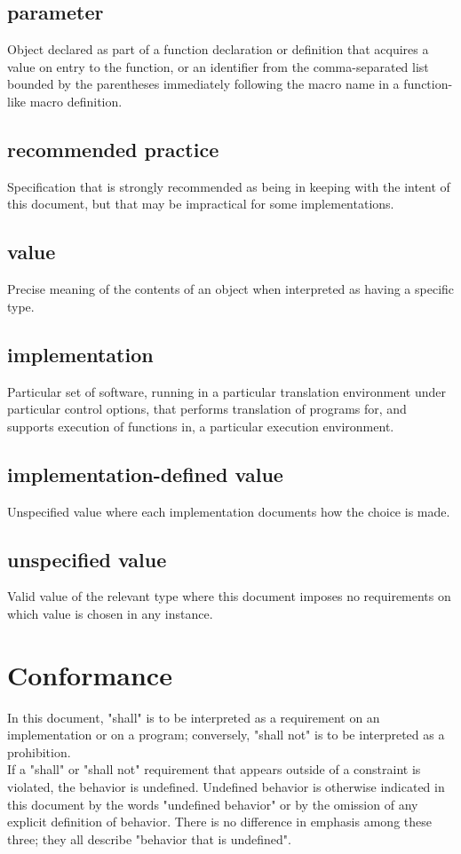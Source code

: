 \documentclass{article}
\begin{document}
\subsection*{parameter}
Object declared as part of a function declaration or definition that acquires a value on
entry to the function, or an identifier from the comma-separated list bounded by the
parentheses immediately following the macro name in a function-like macro definition.

\subsection*{recommended practice}
Specification that is strongly recommended as being in keeping with the intent of this
document, but that may be impractical for some implementations.

\subsection*{value}
Precise meaning of the contents of an object when interpreted as having a specific type.

\subsection*{implementation}
Particular set of software, running in a particular translation environment under
particular control options, that performs translation of programs for, and supports
execution of functions in, a particular execution environment.

\subsection*{implementation-defined value}
Unspecified value where each implementation documents how the choice is made.

\subsection*{unspecified value}
Valid value of the relevant type where this document imposes no requirements on which
value is chosen in any instance.

\section{Conformance}
In this document, "shall" is to be interpreted as a requirement on an implementation
or on a program; conversely, "shall not" is to be interpreted as a prohibition. \\
If a "shall" or "shall not" requirement that appears outside of a constraint is violated,
the behavior is undefined.  Undefined behavior is otherwise indicated in this document by
the words "undefined behavior" or by the omission of any explicit definition of behavior.
There is no difference in emphasis among these three; they all describe "behavior that is
undefined".
\end{document}
